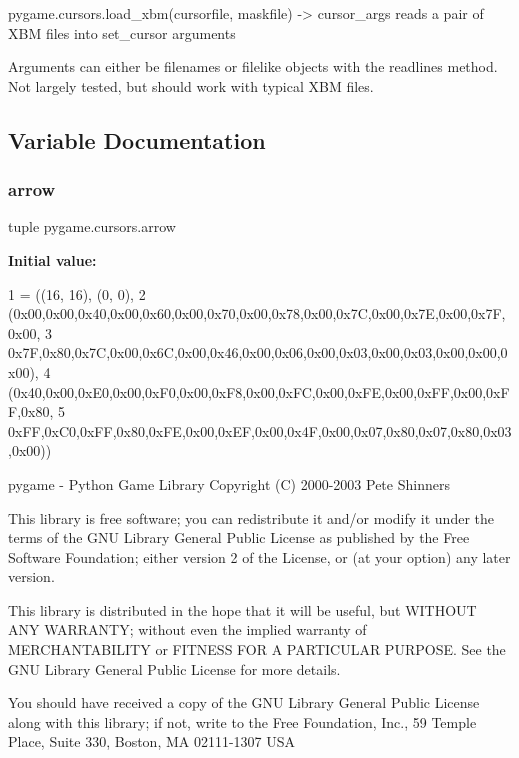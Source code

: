 \begin{DoxyVerb}pygame.cursors.load_xbm(cursorfile, maskfile) -> cursor_args
reads a pair of XBM files into set_cursor arguments

Arguments can either be filenames or filelike objects
with the readlines method. Not largely tested, but
should work with typical XBM files.
\end{DoxyVerb}
 

\subsection{Variable Documentation}
\mbox{\label{namespacepygame_1_1cursors_af1f11288e22a66d5740e960da4da51b2}} 
\subsubsection{\texorpdfstring{arrow}{arrow}}
{\footnotesize\ttfamily tuple pygame.\+cursors.\+arrow}

{\bfseries Initial value\+:}
\begin{DoxyCode}
1 =  ((16, 16), (0, 0),
2     (0x00,0x00,0x40,0x00,0x60,0x00,0x70,0x00,0x78,0x00,0x7C,0x00,0x7E,0x00,0x7F,0x00,
3      0x7F,0x80,0x7C,0x00,0x6C,0x00,0x46,0x00,0x06,0x00,0x03,0x00,0x03,0x00,0x00,0x00),
4     (0x40,0x00,0xE0,0x00,0xF0,0x00,0xF8,0x00,0xFC,0x00,0xFE,0x00,0xFF,0x00,0xFF,0x80,
5      0xFF,0xC0,0xFF,0x80,0xFE,0x00,0xEF,0x00,0x4F,0x00,0x07,0x80,0x07,0x80,0x03,0x00))
\end{DoxyCode}


pygame -\/ Python Game Library Copyright (C) 2000-\/2003 Pete Shinners 

This library is free software; you can redistribute it and/or modify it under the terms of the G\+NU Library General Public License as published by the Free Software Foundation; either version 2 of the License, or (at your option) any later version.

This library is distributed in the hope that it will be useful, but W\+I\+T\+H\+O\+UT A\+NY W\+A\+R\+R\+A\+N\+TY; without even the implied warranty of M\+E\+R\+C\+H\+A\+N\+T\+A\+B\+I\+L\+I\+TY or F\+I\+T\+N\+E\+SS F\+OR A P\+A\+R\+T\+I\+C\+U\+L\+AR P\+U\+R\+P\+O\+SE. See the G\+NU Library General Public License for more details.

You should have received a copy of the G\+NU Library General Public License along with this library; if not, write to the Free Foundation, Inc., 59 Temple Place, Suite 330, Boston, MA 02111-\/1307 U\+SA

